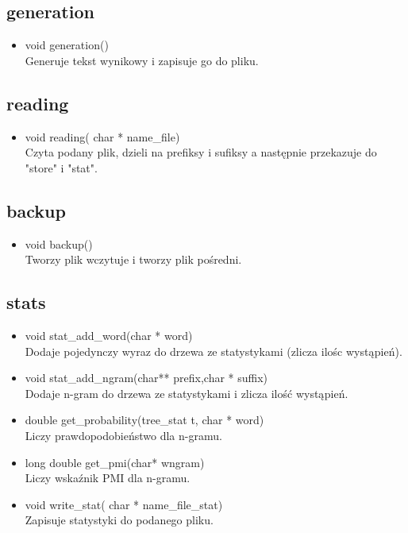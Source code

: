 \documentclass[12pt,a4paper]{report}
\begin{document}
	\subsection*{generation} 
		\begin{itemize}
			
			\item void generation()\\
			Generuje tekst wynikowy i zapisuje go do pliku.
			
		\end{itemize}
	
	\subsection*{reading} 
		\begin{itemize}
			
			\item void reading( char * name\_file)\\
			Czyta podany plik, dzieli na prefiksy i sufiksy a następnie przekazuje do "store" i "stat".
			
		\end{itemize}
	
	\subsection*{backup} 
		\begin{itemize}
			
			\item void backup()\\
			Tworzy plik wczytuje i tworzy plik pośredni.
			
		\end{itemize}
	\subsection*{stats}
		\begin{itemize}
			
			\item void stat\_add\_word(char * word) \\
			Dodaje pojedynczy wyraz do drzewa ze statystykami (zlicza ilośc wystąpień).
			
			\item void stat\_add\_ngram(char** prefix,char * suffix)\\
			Dodaje n-gram do drzewa ze statystykami i zlicza ilość wystąpień.
			
			\item double get\_probability(tree\_stat t, char * word)\\
			Liczy prawdopodobieństwo dla n-gramu.
			
			\item long double get\_pmi(char* wngram)\\
			Liczy wskaźnik PMI dla n-gramu.
			
			\item void write\_stat( char * name\_file\_stat)\\
			Zapisuje statystyki do podanego pliku.
			
		\end{itemize}
\end{document}
